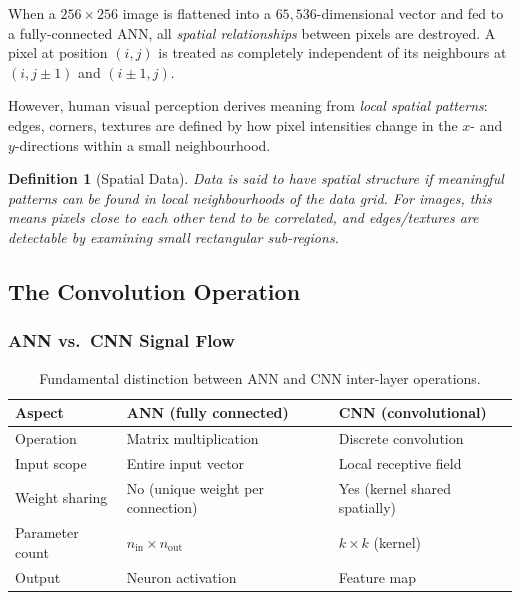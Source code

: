 \documentclass[12pt,a4paper]{article}
\newtheorem{definition}{Definition}[section]
\begin{document}
When a $256 \times 256$ image is flattened into a $65{,}536$-dimensional
vector and fed to a fully-connected ANN, all \emph{spatial relationships}
between pixels are destroyed.  A pixel at position $(i, j)$ is treated as
completely independent of its neighbours at $(i, j\pm1)$ and
$(i\pm1, j)$.

However, human visual perception derives meaning from \emph{local spatial
patterns}: edges, corners, textures are defined by how pixel intensities
change in the $x$- and $y$-directions within a small neighbourhood.

\begin{definition}[Spatial Data]
  \label{def:spatial_data}
  Data is said to have \emph{spatial structure} if meaningful patterns can
  be found in local neighbourhoods of the data grid.  For images, this means
  pixels close to each other tend to be correlated, and edges/textures are
  detectable by examining small rectangular sub-regions.
\end{definition}

\subsection{The Convolution Operation}
\label{sec:cnn_intro:convolution}

\subsubsection{ANN vs.\ CNN Signal Flow}
\label{sec:cnn_intro:convolution:comparison}

\begin{table}[htbp]
  \centering
  \caption{Fundamental distinction between ANN and CNN inter-layer
           operations.}
  \label{tab:ann_vs_cnn}
  \begin{tabular}{lll}
    \toprule
    \textbf{Aspect} & \textbf{ANN (fully connected)} & \textbf{CNN (convolutional)} \\
    \midrule
    Operation     & Matrix multiplication             & Discrete convolution \\
    Input scope   & Entire input vector               & Local receptive field \\
    Weight sharing& No (unique weight per connection) & Yes (kernel shared spatially) \\
    Parameter count & $n_{\text{in}} \times n_{\text{out}}$ & $k \times k$ (kernel) \\
    Output        & Neuron activation                 & Feature map \\
    \bottomrule
  \end{tabular}
\end{table}
\end{document}
